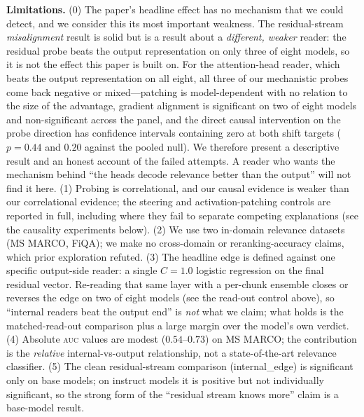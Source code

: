 \documentclass[11pt]{article}
\newcommand{\auc}{\textsc{auc}}
\begin{document}
\textbf{Limitations.} (0) The paper's headline effect has no mechanism that we
could detect, and we consider this its most important weakness. The
residual-stream \emph{misalignment} result is solid but is a result about a
\emph{different, weaker} reader: the residual probe beats the output
representation on only three of eight models, so it is not the effect this paper
is built on. For the attention-head reader, which beats the output
representation on all eight, all three of our mechanistic probes come back
negative or mixed---patching is model-dependent with no relation to the size of
the advantage, gradient alignment is significant on two of eight models and
non-significant across the panel, and the direct causal intervention on the probe
direction has confidence intervals containing zero at both shift targets
($p=0.44$ and $0.20$ against the pooled null). We therefore present a
descriptive result and an honest account of the failed attempts. A reader who
wants the mechanism behind ``the heads decode relevance better than the output''
will not find it here. (1) Probing is
correlational, and our causal evidence is
weaker than our correlational evidence; the steering and activation-patching
controls are reported in full, including where they fail to separate
competing explanations (see the causality experiments below). (2) We use two in-domain
relevance datasets (MS MARCO, FiQA); we make no cross-domain or
reranking-accuracy claims, which prior exploration refuted. (3) The headline
edge is defined against one specific output-side reader: a single
$C{=}1.0$ logistic regression on the final residual vector. Re-reading that
same layer with a per-chunk ensemble closes or reverses the edge on two of
eight models (see the read-out control above), so ``internal readers beat the
output end'' is \emph{not} what we claim; what holds is the matched-read-out
comparison plus a large margin over the model's own verdict. (4) Absolute
\auc{} values are modest ($0.54$--$0.73$) on MS MARCO; the contribution is the
\emph{relative} internal-vs-output relationship, not a state-of-the-art
relevance classifier. (5) The clean residual-stream comparison
(internal\_edge) is significant only on base models; on instruct models it is
positive but not individually significant, so the strong form of the ``residual
stream knows more'' claim is a base-model result.
\end{document}

